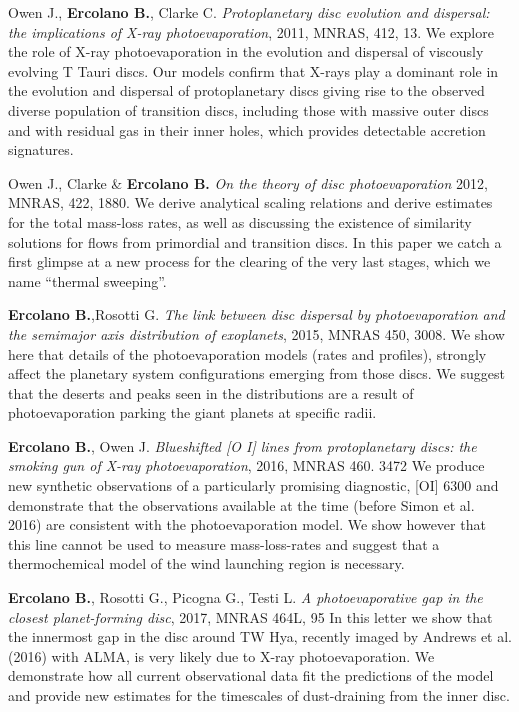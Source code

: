 \documentclass[10pt,fleqn,twoside]{article}
\begin{document}
\begin{literature}
\item Owen J., \textbf{Ercolano B.}, Clarke C.  \textit{
  Protoplanetary disc evolution and dispersal: the implications of X-ray photoevaporation}, 2011, MNRAS, 412, 13.
  We explore the role of X-ray photoevaporation in the evolution and
  dispersal of viscously evolving T Tauri discs. Our models confirm
  that X-rays play a dominant role in the evolution and dispersal of
  protoplanetary discs giving rise to the observed diverse population
  of transition discs, including those with massive outer
  discs and with residual gas in their inner holes, which provides detectable accretion
  signatures.  

\item Owen J., Clarke \& \textbf{Ercolano B.}  \textit{On the theory of disc photoevaporation}
  2012, MNRAS, 422, 1880. We derive analytical scaling relations and
  derive estimates for the total mass-loss rates, as well as
  discussing the existence of similarity solutions for flows from
  primordial and transition discs. In this paper we catch a first
  glimpse at a new process for the clearing of the very last stages,
  which we name ``thermal sweeping''.

\item \textbf{Ercolano B.},Rosotti G. {\em The link between disc
    dispersal by photoevaporation and the semimajor axis distribution
    of exoplanets}, 2015, MNRAS 450,
  3008. We show here that details of the photoevaporation models
  (rates and profiles), strongly affect the planetary system
  configurations emerging from those discs. We suggest that the
  deserts and peaks seen in the distributions are a result of
  photoevaporation parking the giant planets at specific radii.

\item \textbf{Ercolano B.}, Owen J.  {\em Blueshifted [O I] lines from
    protoplanetary discs: the smoking gun of X-ray photoevaporation},
  2016, MNRAS 460. 3472
  We produce new synthetic observations of a particularly promising
  diagnostic, [OI] 6300 and demonstrate that the observations available at the
  time (before Simon et al. 2016) are consistent with the
  photoevaporation model. We show however that this line cannot be
  used to measure mass-loss-rates and suggest that a thermochemical
  model of the wind launching region is necessary. 

\item \textbf{Ercolano B.}, Rosotti G., Picogna G., Testi L.  {\em A photoevaporative gap in the closest planet-forming disc},
  2017, MNRAS 464L, 95
 In this letter we show that the innermost gap in the disc around TW
 Hya, recently imaged by Andrews et al. (2016) with ALMA, is very
 likely due to X-ray photoevaporation. We demonstrate how all current
 observational data fit the predictions of the model and provide new
 estimates for the timescales of dust-draining from the inner disc.


\end{literature}
\end{document}
